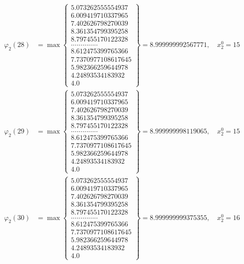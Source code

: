\documentclass{article}
\begin{document}
\begin{align*}
  
  
  
\varphi_{2}(28) &= \max \left\{ \begin{array}{c}
5.073262555554937 \\
 6.009419710337965 \\
 7.402626798270039 \\
 8.361354799395258 \\
 8.797455170122328 \\
 .............. \\
 8.612475399765366 \\
 7.7370977108617645 \\
 5.982366259644978 \\
 4.24893534183932 \\
 4.0
\end{array} \right\} = 8.999999992567771, \quad x_{2}^0 = 15\\
  
  
  
  
\varphi_{2}(29) &= \max \left\{ \begin{array}{c}
5.073262555554937 \\
 6.009419710337965 \\
 7.402626798270039 \\
 8.361354799395258 \\
 8.797455170122328 \\
 .............. \\
 8.612475399765366 \\
 7.7370977108617645 \\
 5.982366259644978 \\
 4.24893534183932 \\
 4.0
\end{array} \right\} = 8.999999998119065, \quad x_{2}^0 = 15\\
  
  
  
  
\varphi_{2}(30) &= \max \left\{ \begin{array}{c}
5.073262555554937 \\
 6.009419710337965 \\
 7.402626798270039 \\
 8.361354799395258 \\
 8.797455170122328 \\
 .............. \\
 8.612475399765366 \\
 7.7370977108617645 \\
 5.982366259644978 \\
 4.24893534183932 \\
 4.0
\end{array} \right\} = 8.999999999375355, \quad x_{2}^0 = 16\\
  

\end{align*}
\end{document}
